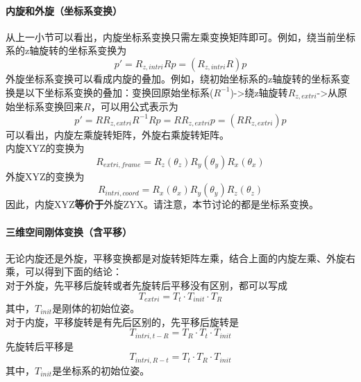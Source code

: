 \documentclass{ctexart}
\begin{document}
	\paragraph{内旋和外旋（坐标系变换）}
	从上一小节可以看出，内旋坐标系变换只需左乘变换矩阵即可。例如，绕当前坐标系的z轴旋转的坐标系变换为
	\begin{equation}
	p' = R_{z,intri} R p = (R_{z,intri} R) p
	\end{equation}
	外旋坐标系变换可以看成内旋的叠加。例如，绕初始坐标系的z轴旋转的坐标系变换是以下坐标系变换的叠加：变换回原始坐标系($R^{-1}$)->绕z轴旋转$R_{z,extri}$->从原始坐标系变换回来$R$，可以用公式表示为
	\begin{equation}
	p' = R R_{z,extri} R^{-1} R p = R R_{z,extri} p = (R R_{z,extri}) p
	\end{equation}
	可以看出，内旋左乘旋转矩阵，外旋右乘旋转矩阵。\\
	内旋XYZ的变换为
	\begin{equation}
	R_{extri,frame}=R_z(\theta_z) R_y(\theta_y) R_x(\theta_x)
	\end{equation}
	外旋XYZ的变换为
	\begin{equation}
	R_{intri,coord}=R_x(\theta_x) R_y(\theta_y) R_z(\theta_z)
	\end{equation}
	因此，内旋XYZ\textbf{等价于}外旋ZYX。请注意，本节讨论的都是坐标系变换。
	
	\paragraph{三维空间刚体变换（含平移）}
	无论内旋还是外旋，平移变换都是对旋转矩阵左乘，结合上面的内旋左乘、外旋右乘，可以得到下面的结论：\\
	对于外旋，先平移后旋转或者先旋转后平移没有区别，都可以写成
	\begin{equation}
	T_{extri} = T_t \cdot T_{init} \cdot T_R
	\end{equation}
	其中，$T_{init}$是刚体的初始位姿。\\
	对于内旋，平移旋转是有先后区别的，先平移后旋转是
	\begin{equation}
		T_{intri,t-R} = T_R \cdot T_t \cdot T_{init}
	\end{equation}
	先旋转后平移是
	\begin{equation}
	T_{intri,R-t} = T_t \cdot T_R \cdot T_{init}
	\end{equation}
	其中，$T_{init}$是坐标系的初始位姿。
	
\end{document}
